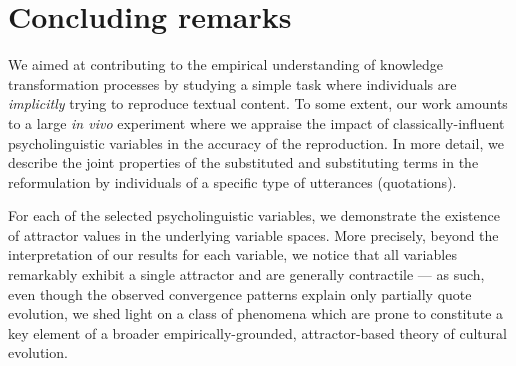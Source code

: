 \section{Concluding remarks}\label{sec:conclusion}
We aimed at contributing to the empirical understanding of knowledge transformation processes by studying a simple task where individuals are \emph{implicitly} trying to reproduce textual content. To some extent, our work amounts to a large \emph{in vivo} experiment where we appraise the impact of classically-influent psycholinguistic variables in the accuracy of the reproduction.
In more detail, we describe the joint properties of the substituted and substituting terms in the reformulation by individuals of a specific type of utterances (quotations). %

For each of the selected psycholinguistic variables, we demonstrate the existence of attractor values in the underlying variable spaces. More precisely, beyond the interpretation of our results for each variable, we notice that all variables remarkably exhibit a single attractor and are generally contractile --- as such, even though the observed convergence patterns  explain only partially quote evolution, we shed light on a class of phenomena which are prone to constitute a key element of a broader empirically-grounded, attractor-based theory of cultural evolution. 






